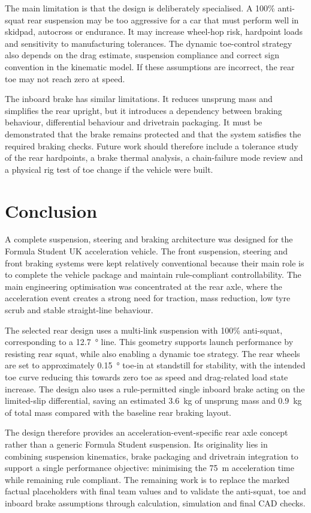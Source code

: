 The main limitation is that the design is deliberately specialised. A 100\% anti-squat rear suspension may be too aggressive for a car that must perform well in skidpad, autocross or endurance. It may increase wheel-hop risk, hardpoint loads and sensitivity to manufacturing tolerances. The dynamic toe-control strategy also depends on the drag estimate, suspension compliance and correct sign convention in the kinematic model. If these assumptions are incorrect, the rear toe may not reach zero at speed.

The inboard brake has similar limitations. It reduces unsprung mass and simplifies the rear upright, but it introduces a dependency between braking behaviour, differential behaviour and drivetrain packaging. It must be demonstrated that the brake remains protected and that the system satisfies the required braking checks. Future work should therefore include a tolerance study of the rear hardpoints, a brake thermal analysis, a chain-failure mode review and a physical rig test of toe change if the vehicle were built.

\section{Conclusion}

A complete suspension, steering and braking architecture was designed for the Formula Student UK acceleration vehicle. The front suspension, steering and front braking systems were kept relatively conventional because their main role is to complete the vehicle package and maintain rule-compliant controllability. The main engineering optimisation was concentrated at the rear axle, where the acceleration event creates a strong need for traction, mass reduction, low tyre scrub and stable straight-line behaviour.

The selected rear design uses a multi-link suspension with 100\% anti-squat, corresponding to a \SI{12.7}{\degree} line. This geometry supports launch performance by resisting rear squat, while also enabling a dynamic toe strategy. The rear wheels are set to approximately \SI{0.15}{\degree} toe-in at standstill for stability, with the intended toe curve reducing this towards zero toe as speed and drag-related load state increase. The design also uses a rule-permitted single inboard brake acting on the limited-slip differential, saving an estimated \SI{3.6}{kg} of unsprung mass and \SI{0.9}{kg} of total mass compared with the baseline rear braking layout.

The design therefore provides an acceleration-event-specific rear axle concept rather than a generic Formula Student suspension. Its originality lies in combining suspension kinematics, brake packaging and drivetrain integration to support a single performance objective: minimising the \SI{75}{m} acceleration time while remaining rule compliant. The remaining work is to replace the marked factual placeholders with final team values and to validate the anti-squat, toe and inboard brake assumptions through calculation, simulation and final CAD checks.
